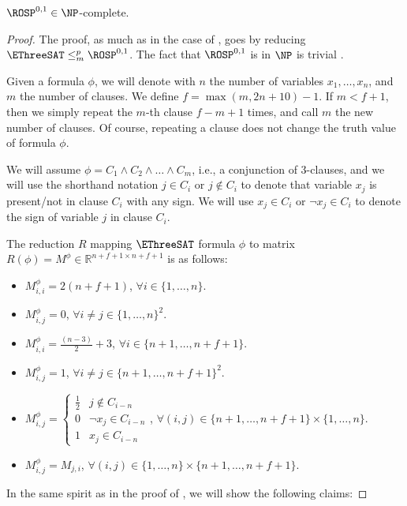 \begin{theorem}
\label{thm:rosp_zero_one_np_complete}
	$\ROSP^{0,1}\in \NP$-complete.
\end{theorem}
\begin{proof}
	The proof, as much as in the case of , goes by reducing $\EThreeSAT\leq^p_m \ROSP^{0,1}$. The fact that $\ROSP^{0,1}$ is in $\NP$ is trivial .
	
	Given a formula $\phi$, we will denote with $n$ the number of variables $x_1, \dots, x_n$, and $m$ the number of clauses. We define $f =\max(m, 2n+10) - 1$. If $m < f + 1$, then we simply repeat the $m$-th clause $f - m + 1$ times, and call $m$ the new number of clauses. Of course, repeating a clause does not change the truth value of formula $\phi$.
	
	We will assume $\phi = C_1 \land C_2 \land \dots \land C_m$, i.e., a conjunction of 3-clauses, and we will use the shorthand notation $j\in C_i$ or $j\notin C_i$ to denote that variable $x_j$ is present/not in clause $C_i$ with any sign. We will use $x_j\in C_i$ or $\neg x_j\in C_i$ to denote the sign of variable $j$ in clause $C_i$.
	
	The reduction $R$ mapping $\EThreeSAT$ formula $\phi$ to matrix $R(\phi) = M^\phi\in\mathbb{R}^{n+f+1\times n + f + 1}$ is as follows:
	\begin{itemize}
		\item $M^\phi_{i,i} = 2 (n + f + 1)$, $\forall i \in \{1, \dots, n\}$.
		\item  $M^\phi_{i,j} = 0$, $\forall i\neq j \in \{1, \dots, n\}^2$.
		\item $M^\phi_{i,i} = \frac{(n-3)}{2} + 3$, $\forall i \in \{n+1, \dots, n+f+1\}. $
		\item   $M^\phi_{i,j} = 1$, $\forall i\neq j \in \{n+1, \dots, n+f+1\}^2$.
		\item $M^\phi_{i,j} = \begin{cases}
			\frac{1}{2} & j \notin C_{i-n} \\
			0 & \neg x_j \in C_{i-n} \\
			1 & x_j \in C_{i-n}
		\end{cases}$, $\forall (i, j) \in\{n+1, \dots, n+f+1\}\times \{1, \dots, n\}$.
		\item $M_{i,j}^\phi = M_{j,i}$, $\forall (i,j) \in\{1, \dots, n\}\times \{n+1, \dots, n+f+1\}$.
	\end{itemize}
	
	In the same spirit as in the proof of , we will show the following claims:
	

\end{proof}
